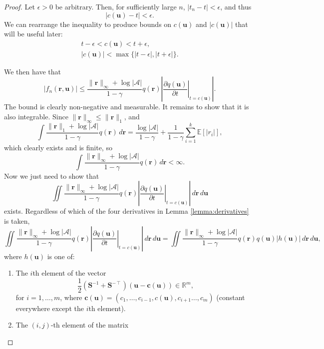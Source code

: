 \documentclass{article}
\theoremstyle{definition}
\newcommand{\fn}{f_n(\mathbf{r}, \mathbf{u})}
\newcommand{\dx}{\,d\mathbf{r}\,d\mathbf{u}}
\newcommand{\rinf}{\lVert \mathbf{r} \rVert_\infty}
\newcommand{\vbound}{\frac{\rinf + \log|\mathcal{A}|}{1 - \gamma}}
\begin{document}
\begin{proof}
  Let $\epsilon > 0$ be arbitrary. Then, for sufficiently large $n$, $|t_n - t|
  < \epsilon$, and thus
  \begin{equation} \label{eq:epsilon_bound}
    |c(\mathbf{u}) - t| < \epsilon.
  \end{equation}
  We can rearrange the inequality to produce bounds on $c(\mathbf{u})$ and
  $|c(\mathbf{u})|$ that will be useful later:
  \begin{align}
    t - \epsilon < c(\mathbf{u}) < t + \epsilon, \nonumber \\
    |c(\mathbf{u})| < \max \{ |t - \epsilon|, |t + \epsilon| \}. \label{eq:c_bound}
  \end{align}
  
  We then have that
  \[ |\fn| \le \vbound q(\mathbf{r}) \left| \left. \frac{\partial
          q(\mathbf{u})}{\partial t} \right|_{t=c(\mathbf{u})} \right|. \]
  The bound is clearly non-negative and measurable. It remains to show that it
  is also integrable. Since $\rinf \le \lVert \mathbf{r} \rVert_1$, and
  \[ \int \frac{\lVert \mathbf{r} \rVert_1 + \log|\mathcal{A}|}{1 -
      \gamma}q(\mathbf{r}) \,d\mathbf{r} = \frac{\log|\mathcal{A}|}{1 - \gamma}
    + \frac{1}{1 - \gamma} \sum_{i=1}^k \mathbb{E}[|r_i|], \]
  which clearly exists and is finite, so
  \[ \int \vbound q(\mathbf{r}) \,d\mathbf{r} < \infty. \]
  Now we just need to show that
  \begin{equation} \label{eq:last_goal}
    \iint \vbound q(\mathbf{r}) \left| \left. \frac{\partial
          q(\mathbf{u})}{\partial t} \right|_{t=c(\mathbf{u})} \right|\dx
  \end{equation}
  exists. Regardless of which of the four derivatives in Lemma
  \ref{lemma:derivatives} is taken, %
  \[ \iint \vbound q(\mathbf{r}) \left| \left. \frac{\partial
          q(\mathbf{u})}{\partial t} \right|_{t=c(\mathbf{u})} \right|\dx =
    \iint \vbound q(\mathbf{r}) q(\mathbf{u}) |h(\mathbf{u})| \dx, \]
  where $h(\mathbf{u})$ is one of: %
  \begin{enumerate} %
  \item The $i$th element of the vector
    \[ \frac{1}{2}(\mathbf{S}^{-1} + \mathbf{S}^{-\intercal})(\mathbf{u} -
      \mathbf{c}(\mathbf{u})) \in \mathbb{R}^m, \]
    for $i = 1, \dots, m$, where $\mathbf{c}(\mathbf{u}) = (c_1, \dots, c_{i -
      1}, c(\mathbf{u}), c_{i + 1} \dots, c_m)$ (constant everywhere except the
    $i$th element).
  \item The $(i,j)$-th element of the matrix

\end{enumerate}
\end{proof}
\end{document}
